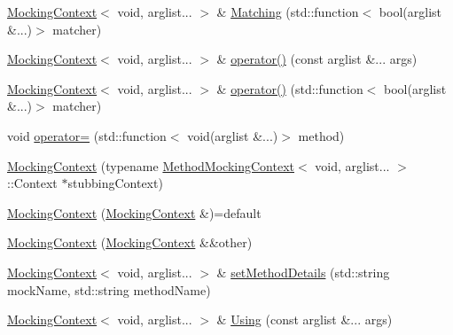 \begin{DoxyCompactItemize}
\item 
\mbox{\hyperlink{classfakeit_1_1MockingContext}{Mocking\+Context}}$<$ void, arglist... $>$ \& \mbox{\hyperlink{classfakeit_1_1MockingContext_3_01void_00_01arglist_8_8_8_01_4_a28152fc4e0105f5e6424515367a5d4c3}{Matching}} (std\+::function$<$ bool(arglist \&...)$>$ matcher)
\item 
\mbox{\hyperlink{classfakeit_1_1MockingContext}{Mocking\+Context}}$<$ void, arglist... $>$ \& \mbox{\hyperlink{classfakeit_1_1MockingContext_3_01void_00_01arglist_8_8_8_01_4_a73476d376f7ec5631ba9a37ff5264599}{operator()}} (const arglist \&... args)
\item 
\mbox{\hyperlink{classfakeit_1_1MockingContext}{Mocking\+Context}}$<$ void, arglist... $>$ \& \mbox{\hyperlink{classfakeit_1_1MockingContext_3_01void_00_01arglist_8_8_8_01_4_a1a5a55569a763877d395635979e6b3d6}{operator()}} (std\+::function$<$ bool(arglist \&...)$>$ matcher)
\item 
void \mbox{\hyperlink{classfakeit_1_1MockingContext_3_01void_00_01arglist_8_8_8_01_4_a86584df9e9a7a73b078ad68fa5893d50}{operator=}} (std\+::function$<$ void(arglist \&...)$>$ method)
\item 
\mbox{\hyperlink{classfakeit_1_1MockingContext_3_01void_00_01arglist_8_8_8_01_4_a655f7e31674dfb282f30a94f31ffd2a7}{Mocking\+Context}} (typename \mbox{\hyperlink{classfakeit_1_1MethodMockingContext}{Method\+Mocking\+Context}}$<$ void, arglist... $>$\+::Context $\ast$stubbing\+Context)
\item 
\mbox{\hyperlink{classfakeit_1_1MockingContext_3_01void_00_01arglist_8_8_8_01_4_a750dcc8fb80a9931c41143ce73d7177c}{Mocking\+Context}} (\mbox{\hyperlink{classfakeit_1_1MockingContext}{Mocking\+Context}} \&)=default
\item 
\mbox{\hyperlink{classfakeit_1_1MockingContext_3_01void_00_01arglist_8_8_8_01_4_a1f7b3663809191b919290f0db05d59f1}{Mocking\+Context}} (\mbox{\hyperlink{classfakeit_1_1MockingContext}{Mocking\+Context}} \&\&other)
\item 
\mbox{\hyperlink{classfakeit_1_1MockingContext}{Mocking\+Context}}$<$ void, arglist... $>$ \& \mbox{\hyperlink{classfakeit_1_1MockingContext_3_01void_00_01arglist_8_8_8_01_4_a5479ea5b1a1f32898cc9592bfb1c7777}{set\+Method\+Details}} (std\+::string mock\+Name, std\+::string method\+Name)
\item 
\mbox{\hyperlink{classfakeit_1_1MockingContext}{Mocking\+Context}}$<$ void, arglist... $>$ \& \mbox{\hyperlink{classfakeit_1_1MockingContext_3_01void_00_01arglist_8_8_8_01_4_a0dad4e59214a5fdcacad0e4a170df071}{Using}} (const arglist \&... args)

\end{DoxyCompactItemize}
